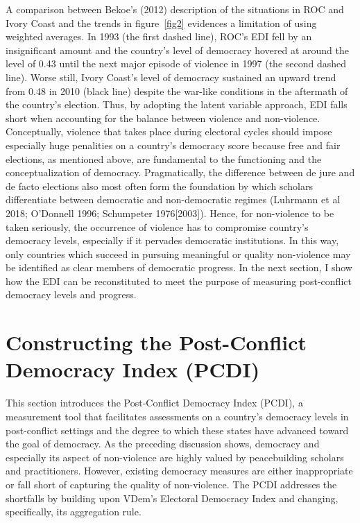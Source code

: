 \documentclass [11pt]{article}
\begin{document}
A comparison between Bekoe's (2012) description of the situations in ROC and Ivory Coast and the trends in figure~\ref{fig2} evidences a limitation of using weighted averages. In 1993 (the first dashed line), ROC's EDI fell by an insignificant amount and the country's level of democracy hovered at around the level of 0.43 until the next major episode of violence in 1997 (the second dashed line). Worse still, Ivory Coast's level of democracy sustained an upward trend from 0.48 in 2010 (black line) despite the war-like conditions in the aftermath of the country's election. Thus, by adopting the latent variable approach, EDI falls short when accounting for the balance between violence and non-violence. Conceptually, violence that takes place during electoral cycles should impose especially huge penalities on a country's democracy score because free and fair elections, as mentioned above, are fundamental to the functioning and the conceptualization of democracy. Pragmatically, the difference between de jure and de facto elections also most often form the foundation by which scholars differentiate between democratic and non-democratic regimes (Luhrmann et al 2018; O'Donnell 1996; Schumpeter 1976[2003]). Hence, for non-violence to be taken seriously, the occurrence of violence has to compromise country's democracy levels, especially if it pervades democratic institutions. In this way, only countries which succeed in pursuing meaningful or quality non-violence may be identified as clear members of democratic progress. In the next section, I show how the EDI can be reconstituted to meet the purpose of measuring post-conflict democracy levels and progress.

\section*{Constructing the Post-Conflict Democracy Index (PCDI)}

This section introduces the Post-Conflict Democracy Index (PCDI), a measurement tool that facilitates assessments on a country's democracy levels in post-conflict settings and the degree to which these states have advanced toward the goal of democracy. As the preceding discussion shows, democracy and especially its aspect of non-violence are highly valued by peacebuilding scholars and practitioners. However, existing democracy measures are either inappropriate or fall short of capturing the quality of non-violence. The PCDI addresses the shortfalls by building upon VDem's Electoral Democracy Index and changing, specifically, its aggregation rule.
\end{document}
